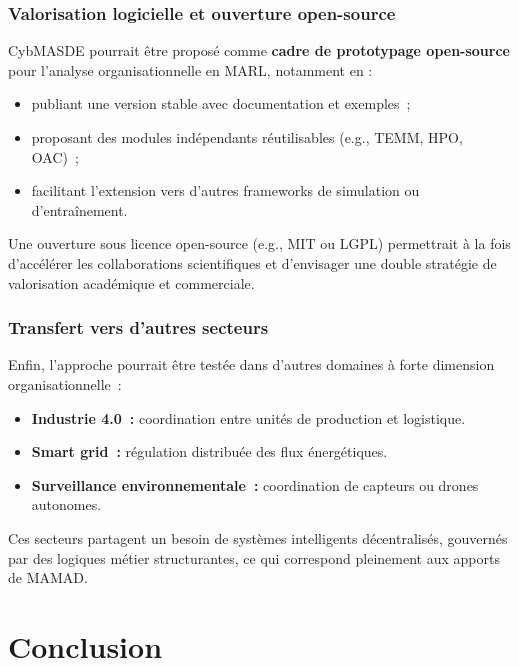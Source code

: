 \subsection*{Valorisation logicielle et ouverture open-source}

CybMASDE pourrait être proposé comme \textbf{cadre de prototypage open-source} pour l’analyse organisationnelle en MARL, notamment en :
\begin{itemize}
    \item publiant une version stable avec documentation et exemples~;
    \item proposant des modules indépendants réutilisables (e.g., TEMM, HPO, OAC)~;
    \item facilitant l’extension vers d’autres frameworks de simulation ou d’entraînement.
\end{itemize}

Une ouverture sous licence open-source (e.g., MIT ou LGPL) permettrait à la fois d’accélérer les collaborations scientifiques et d’envisager une double stratégie de valorisation académique et commerciale.

\subsection*{Transfert vers d'autres secteurs}

Enfin, l’approche pourrait être testée dans d'autres domaines à forte dimension organisationnelle~:
\begin{itemize}
    \item \textbf{Industrie 4.0~:} coordination entre unités de production et logistique.
    \item \textbf{Smart grid~:} régulation distribuée des flux énergétiques.
    \item \textbf{Surveillance environnementale~:} coordination de capteurs ou drones autonomes.
\end{itemize}

Ces secteurs partagent un besoin de systèmes intelligents décentralisés, gouvernés par des logiques métier structurantes, ce qui correspond pleinement aux apports de \ac{MAMAD}.


\clearpage
\thispagestyle{empty}
\null
\newpage

\chapter*{Conclusion}

